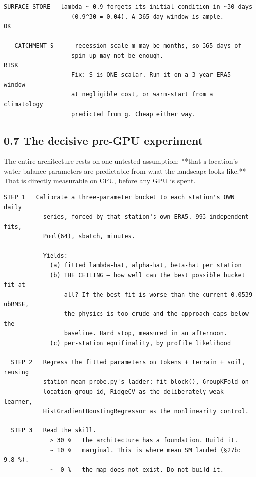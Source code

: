 \documentclass[10pt,a4paper]{article}
\begin{document}
\begin{Verbatim}[fontsize=\scriptsize,frame=leftline,framerule=0.6pt,rulecolor=\color{rulegray},xleftmargin=6pt,framesep=6pt,]
   SURFACE STORE   lambda ~ 0.9 forgets its initial condition in ~30 days
                   (0.9^30 = 0.04). A 365-day window is ample.          OK

   CATCHMENT S      recession scale m may be months, so 365 days of
                   spin-up may not be enough.                           RISK
                   Fix: S is ONE scalar. Run it on a 3-year ERA5 window
                   at negligible cost, or warm-start from a climatology
                   predicted from g. Cheap either way.
\end{Verbatim}

\subsection*{0.7 The decisive pre-GPU experiment}

The entire architecture rests on one untested assumption: **that a location's
water-balance parameters are predictable from what the landscape looks like.**
That is directly measurable on CPU, before any GPU is spent.

\begin{Verbatim}[fontsize=\scriptsize,frame=leftline,framerule=0.6pt,rulecolor=\color{rulegray},xleftmargin=6pt,framesep=6pt,]
  STEP 1   Calibrate a three-parameter bucket to each station's OWN daily
           series, forced by that station's own ERA5. 993 independent fits,
           Pool(64), sbatch, minutes.

           Yields:
             (a) fitted lambda-hat, alpha-hat, beta-hat per station
             (b) THE CEILING — how well can the best possible bucket fit at
                 all? If the best fit is worse than the current 0.0539 ubRMSE,
                 the physics is too crude and the approach caps below the
                 baseline. Hard stop, measured in an afternoon.
             (c) per-station equifinality, by profile likelihood

  STEP 2   Regress the fitted parameters on tokens + terrain + soil, reusing
           station_mean_probe.py's ladder: fit_block(), GroupKFold on
           location_group_id, RidgeCV as the deliberately weak learner,
           HistGradientBoostingRegressor as the nonlinearity control.

  STEP 3   Read the skill.
             > 30 %   the architecture has a foundation. Build it.
             ~ 10 %   marginal. This is where mean SM landed (§27b: 9.8 %).
             ~  0 %   the map does not exist. Do not build it.
\end{Verbatim}
\end{document}
